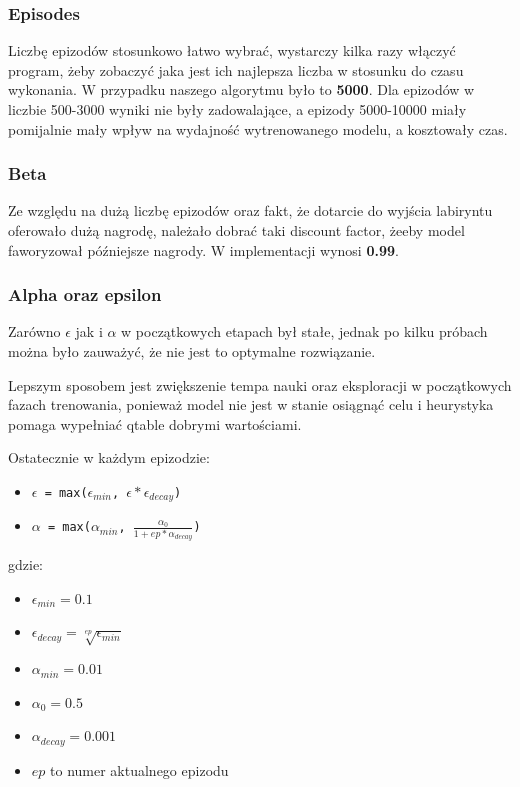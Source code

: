 \documentclass[a4paper,12pt]{article}
\begin{document}
    \subsubsection*{Episodes}
    Liczbę epizodów stosunkowo łatwo wybrać, wystarczy kilka razy włączyć program, żeby zobaczyć jaka jest ich najlepsza liczba w stosunku do czasu wykonania.
    W przypadku naszego algorytmu było to \textbf{5000}.
    Dla epizodów w liczbie 500-3000 wyniki nie były zadowalające, a epizody 5000-10000 miały pomijalnie mały wpływ na wydajność wytrenowanego modelu, a kosztowały czas.
    
    \subsubsection*{Beta}
    Ze względu na dużą liczbę epizodów oraz fakt, że dotarcie do wyjścia labiryntu oferowało dużą nagrodę, należało dobrać taki discount factor, żeeby model faworyzował późniejsze nagrody.
    W implementacji wynosi \textbf{0.99}.

    \subsubsection*{Alpha oraz epsilon}
    Zarówno $\epsilon$ jak i $\alpha$ w początkowych etapach był stałe, jednak po kilku próbach można było zauważyć, że nie jest to optymalne rozwiązanie.

    Lepszym sposobem jest zwiększenie tempa nauki oraz eksploracji w początkowych fazach trenowania, ponieważ model nie jest w stanie osiągnąć celu i heurystyka pomaga wypełniać qtable dobrymi wartościami.
    
    Ostatecznie w każdym epizodzie:
    \begin{itemize}
        \item \texttt{$\epsilon$ = max($\epsilon_{min}$, $\epsilon * \epsilon_{decay}$)}
        \item \texttt{$\alpha$ = max($\alpha_{min}$, $\frac{\alpha_0}{1 + ep * \alpha_{decay}}$)}
    \end{itemize}
    
    gdzie:
    \begin{itemize}
        \item $\epsilon_{min} = 0.1$
        \item $\epsilon_{decay} = \sqrt[ep]{\epsilon_{min}}$\
        \item $\alpha_{min} = 0.01$
        \item $\alpha_0 = 0.5$
        \item $\alpha_{decay} = 0.001$
        \item $ep$ to numer aktualnego epizodu
    \end{itemize}
\end{document}
